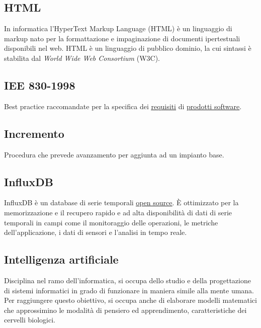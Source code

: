 	\subsection{HTML}
	\label{sec:html}
	In informatica l'HyperText Markup Language (HTML) è un linguaggio di markup  nato per la formattazione e impaginazione di documenti ipertestuali disponibili nel web. HTML è un linguaggio di pubblico dominio, la cui sintassi è stabilita dal \emph{World Wide Web Consortium} (W3C).


	\newpage


	\subsection{IEE 830-1998}
	\label{sec:iee830}
	Best practice raccomandate per la specifica dei \underline{\hyperref[sec:requisito]{requisiti}} di \underline{\hyperref[sec:prodottosoftware]{prodotti software}}.


	\subsection{Incremento}
	\label{sec:incremento}
	Procedura che prevede avanzamento per aggiunta ad un impianto base.


	\subsection{InfluxDB}
	\label{sec:influxdb}
	InfluxDB è un database di serie temporali \underline{\hyperref[sec:opensource]{open source}}. È ottimizzato per la memorizzazione e il recupero rapido e ad alta disponibilità di dati di serie temporali in campi come il monitoraggio delle operazioni, le metriche dell'applicazione, i dati di sensori e l'analisi in tempo reale.


	\subsection{Intelligenza artificiale}
	\label{sec:ia}
	Disciplina nel ramo dell'informatica, si occupa dello studio e della progettazione di sistemi informatici in grado di funzionare in maniera simile alla mente umana. Per raggiungere questo obiettivo, si occupa anche di elaborare modelli matematici che approssimino le modalità di pensiero ed apprendimento, caratteristiche dei cervelli biologici.



